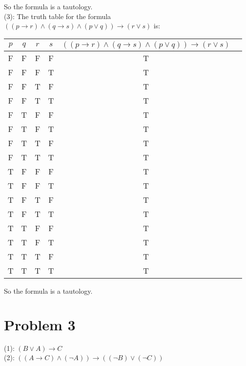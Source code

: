 \documentclass{article}
\begin{document}
So the formula is a tautology.\\
(3): The truth table for the formula $ ((p \rightarrow r) \wedge (q \rightarrow s) \wedge (p \vee q)) \rightarrow (r \vee s)$ is:\\
\begin{table}[H]
\centering
\begin{tabular}{|c|c|c|c|c|c|}
\hline
$p$ & $q$ & $r$ & $s$ & $((p \rightarrow r) \wedge (q \rightarrow s) \wedge (p \vee q)) \rightarrow (r \vee s)$\\
\hline
F & F & F & F & T\\
F & F & F & T & T\\
F & F & T & F & T\\
F & F & T & T & T\\
F & T & F & F & T\\
F & T & F & T & T\\
F & T & T & F & T\\
F & T & T & T & T\\
T & F & F & F & T\\
T & F & F & T & T\\
T & F & T & F & T\\
T & F & T & T & T\\
T & T & F & F & T\\
T & T & F & T & T\\
T & T & T & F & T\\
T & T & T & T & T\\
\hline
\end{tabular}
\end{table}
So the formula is a tautology.\\
\section{Problem 3}
(1): $(B \vee A) \rightarrow C$\\
(2): $((A \rightarrow C) \wedge (\neg A)) \rightarrow ((\neg B) \vee (\neg C))$\\
\end{document}
